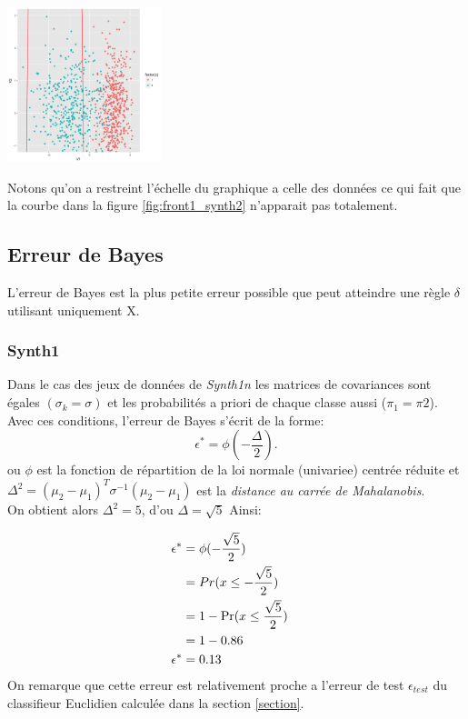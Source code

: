 \documentclass[10pt]{article}
\begin{document}
\begin{center}
	\includegraphics[width=45mm]{Figures/Exo2/curve_synth2.png}
	\label{fig:front1_synth2}
\end{center}%
\hspace{0.02\linewidth}

\vspace{1mm}
Notons qu'on a restreint l'échelle du graphique a celle des données ce qui fait que la courbe dans la figure \ref{fig:front1_synth2}  n'apparait pas totalement.

\subsection{Erreur de Bayes}
L'erreur de Bayes  est la plus petite erreur possible que peut atteindre une règle $\delta$ utilisant uniquement X. 
\subsubsection{Synth1}
Dans le cas des jeux de données de \textit{Synth1n} les matrices de covariances sont égales $(\sigma_{k} = \sigma)$ et les probabilités a priori de chaque classe aussi  ($\pi_{1} = \pi{2}$). Avec ces conditions, l'erreur de Bayes s'écrit de la forme: \[ \epsilon^{*} = \phi(-\frac{\Delta}{2}) . \]
ou $\phi$ est la fonction de répartition de la loi normale (univariee) centrée réduite  et $ \Delta^{2}   = (\mu_{2} - \mu_{1})^{T} \sigma^{-1} (\mu_{2}  - \mu_{1})$ est la \textit{distance au carrée de Mahalanobis}.\\
On obtient alors $\Delta^{2} = 5$, d'ou $\Delta = \sqrt{5} $ Ainsi: 

\begin{align}
 \epsilon^{*}  &=  \phi(-\frac{\sqrt{5}}{2}) \cr
& =  Pr(x \leq -\frac{\sqrt{5}}{2}) \cr
 &= 1 - \Pr(x \leq \frac{\sqrt{5}}{2})\cr
 & = 1 - 0.86\cr
 \epsilon^{*}  & = 0.13
\end{align}
On remarque  que cette erreur est relativement proche a l'erreur de test $\epsilon_{test}$ du classifieur Euclidien calculée dans la section \ref{section}. 
\end{document}
